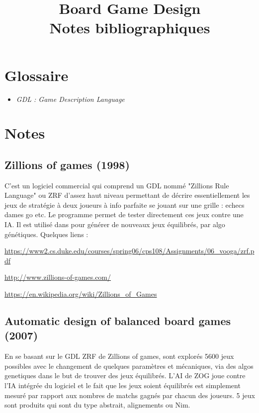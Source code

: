\documentclass[a4paper,11pt]{article}
\title{Board Game Design\\
Notes bibliographiques}
\author{}
\begin{document}
\maketitle 

\tableofcontents

\section{Glossaire}

\begin{itemize}
\item \emph{GDL : Game Description Language}
\end{itemize}

\section{Notes}

\subsection{Zillions of games (1998)} 
C'est un logiciel commercial
qui comprend un GDL nommé "Zillions Rule Language" ou ZRF \cite{lefler2004zillions}  d'assez haut niveau permettant de décrire essentiellement les jeux de stratégie à deux joueurs à info parfaite se jouant sur une grille : echecs dames go etc. Le programme permet de tester directement ces jeux contre une IA.
Il est utilisé dans \cite{hom2007automatic} pour générer de nouveaux jeux équilibrés, par algo génétiques. Quelques liens :

\url{https://www2.cs.duke.edu/courses/spring06/cps108/Assignments/06_vooga/zrf.pdf}

\url{http://www.zillions-of-games.com/}

\url{https://en.wikipedia.org/wiki/Zillions_of_Games}



\subsection{Automatic design of balanced board games (2007) \cite{hom2007automatic}}

En se basant sur le GDL ZRF de Zillions of games, sont explorés 5600 jeux possibles avec le changement de quelques paramètres et mécaniques, via des algos genetiques dans le but de trouver des jeux équilibrés. L'AI de ZOG joue contre l'IA intégrée du logiciel et le fait que les jeux soient équilibrés est simplement mesuré par rapport aux nombres de matchs gagnés par chacun des joueurs. 5 jeux sont produits qui sont du type abstrait, alignements ou Nim.
\end{document}
